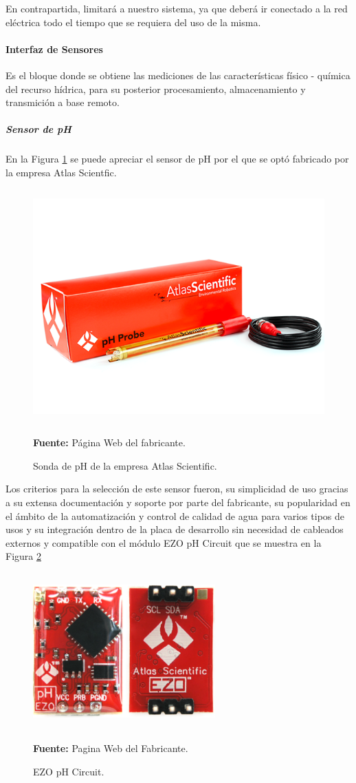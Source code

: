 En contrapartida, limitará a nuestro sistema, ya que deberá ir conectado a la red eléctrica todo el tiempo que se requiera del uso de la misma.

\paragraph[Interfaz de Sensores]{Interfaz de Sensores}
Es el bloque donde se obtiene las mediciones de las caracter\'isticas f\'isico - qu\'imica del recurso h\'idrica, para su posterior procesamiento, almacenamiento y transmici\'on a base remoto.

\subparagraph{Sensor de pH}
En la Figura \ref{fig:4.8} se puede apreciar el sensor de pH por el que se optó fabricado por la empresa Atlas Scientfic.
\begin{figure}[ht]
    \centering
	\includegraphics[width=150mm, height=90mm]{Imagenes/2021/imag23.png}%
	\caption[Sonda de pH de la empresa Atlas Scientific]{Sonda de pH de la empresa Atlas Scientific. }{\textbf{Fuente:} Página Web del fabricante.}
	\label{fig:4.8}
\end{figure}
Los criterios para la selección de este sensor fueron, su simplicidad de uso gracias a su extensa documentación y soporte por parte del fabricante, su popularidad en el ámbito de la automatización y control de calidad de agua para varios tipos de usos y su integración dentro de la placa de desarrollo sin necesidad de cableados externos y compatible con el módulo EZO pH Circuit que se muestra en la Figura \ref{fig:4.9}
\newline
\hfill
    \begin{figure}[ht]
    \centering
	\includegraphics[width=70mm, height=60mm]{Imagenes/2021/imag27.png}%
	\caption[EZO pH Circuit]{EZO pH Circuit.}{\textbf{Fuente:} Pagina Web del Fabricante.}
	\label{fig:4.9}
    \end{figure}
